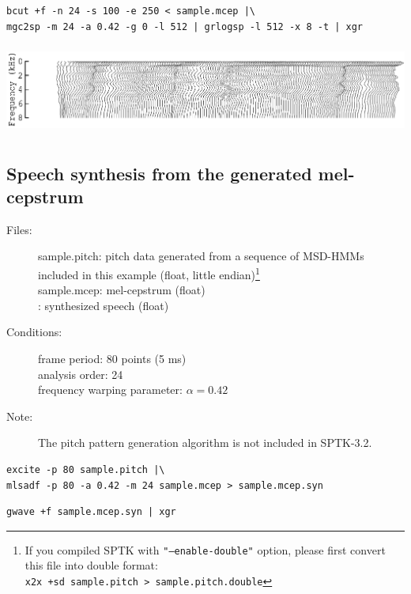 \documentclass[a4paper,10pt]{article}
\begin{document}
\begin{verbatim}
bcut +f -n 24 -s 100 -e 250 < sample.mcep |\
mgc2sp -m 24 -a 0.42 -g 0 -l 512 | grlogsp -l 512 -x 8 -t | xgr
\end{verbatim}
 
\includegraphics[height=3cm]{eps/sample.mcep.grlogsp-t.eps}

\subsection{Speech synthesis from the generated mel-cepstrum}

\begin{description}
\item[Files:]
  sample.pitch: pitch data generated from a sequence of MSD-HMMs included in this
  example (float, little endian)\footnote{If you compiled SPTK with
\texttt{"--enable-double"} option, please first convert this file into double
format:\\ \texttt{x2x +sd sample.pitch > sample.pitch.double}}\\
  sample.mcep: mel-cepstrum (float) \\
  :
  synthesized speech (float)
\item[Conditions:]
  frame period: 80 points (5 ms)\\
  analysis order: 24\\
  frequency warping parameter: $\alpha = 0.42$
\item[Note:]
  The pitch pattern generation algorithm is not included in SPTK-3.2.
\end{description}

\begin{verbatim}
excite -p 80 sample.pitch |\
mlsadf -p 80 -a 0.42 -m 24 sample.mcep > sample.mcep.syn
\end{verbatim}

\begin{verbatim}
gwave +f sample.mcep.syn | xgr
\end{verbatim}
\end{document}
